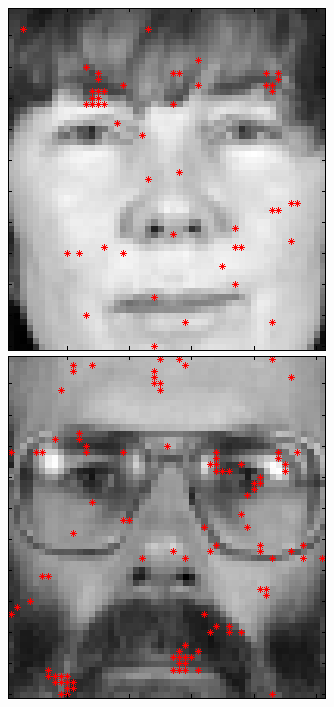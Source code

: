 \begin{figure}[ht]
 \includegraphics[width=\textwidth*11/100]{ch5/figures/XM2VTS_Full_7.png}
 \includegraphics[width=\textwidth*11/100]{ch5/figures/XM2VTS_Full_8.png}\\

\end{figure}
